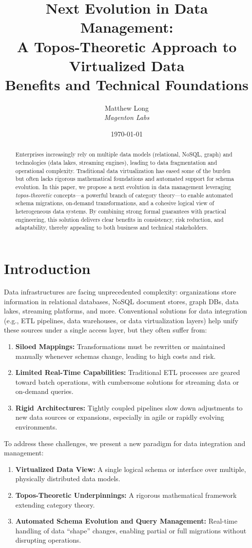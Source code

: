 \documentclass[11pt]{article}
\title{Next Evolution in Data Management:\\
A Topos-Theoretic Approach to Virtualized Data \\
\large{Benefits and Technical Foundations}}
\author{Matthew Long \\
\textit{Magenton Labs}}
\date{\today}
\begin{document}
\maketitle

\begin{abstract}
Enterprises increasingly rely on multiple data models (relational, NoSQL, graph) and technologies (data lakes, streaming engines), leading to data fragmentation and operational complexity. Traditional data virtualization has eased some of the burden but often lacks rigorous mathematical foundations and automated support for schema evolution. In this paper, we propose a next evolution in data management leveraging \emph{topos-theoretic} concepts---a powerful branch of category theory---to enable automated schema migrations, on-demand transformations, and a cohesive logical view of heterogeneous data systems. By combining strong formal guarantees with practical engineering, this solution delivers clear benefits in consistency, risk reduction, and adaptability, thereby appealing to both business and technical stakeholders.
\end{abstract}

\section{Introduction}
Data infrastructures are facing unprecedented complexity: organizations store information in relational databases, NoSQL document stores, graph DBs, data lakes, streaming platforms, and more. Conventional solutions for data integration (e.g., ETL pipelines, data warehouses, or data virtualization layers) help unify these sources under a single access layer, but they often suffer from:
\begin{enumerate}
\item \textbf{Siloed Mappings:} Transformations must be rewritten or maintained manually whenever schemas change, leading to high costs and risk.
\item \textbf{Limited Real-Time Capabilities:} Traditional ETL processes are geared toward batch operations, with cumbersome solutions for streaming data or on-demand queries.
\item \textbf{Rigid Architectures:} Tightly coupled pipelines slow down adjustments to new data sources or expansions, especially in agile or rapidly evolving environments.
\end{enumerate}

To address these challenges, we present a new paradigm for data integration and management:
\begin{enumerate}
\item \textbf{Virtualized Data View:} A single logical schema or interface over multiple, physically distributed data models.
\item \textbf{Topos-Theoretic Underpinnings:} A rigorous mathematical framework extending category theory.
\item \textbf{Automated Schema Evolution and Query Management:} Real-time handling of data “shape” changes, enabling partial or full migrations without disrupting operations.
\end{enumerate}
\end{document}
